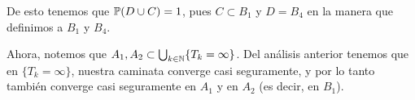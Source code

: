 De esto tenemos que $\mathbb{P}(D \cup C) = 1$, pues $C \subset B_1$ y $D = B_4$ en la manera que definimos a $B_1$ y $B_4$.\par\null

Ahora, notemos que $A_1, A_2 \subset \bigcup_{k \in \mathbb{N}} \{ T_k = \infty \}$. Del análisis anterior tenemos que 
en $\{ T_k = \infty \}$, nuestra caminata converge casi seguramente, y por lo tanto también converge casi seguramente
en $A_1$ y en $A_2$ (es decir, en $B_1$).\par\null



